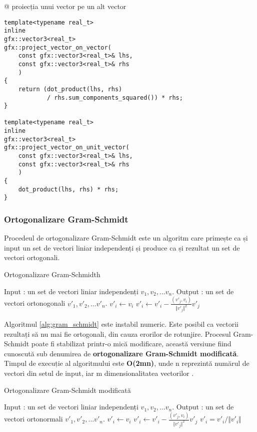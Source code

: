 \begin{easylist}[itemize]
@ proiecția unui vector pe un alt vector

\begin{lstlisting}
template<typename real_t>
inline
gfx::vector3<real_t>
gfx::project_vector_on_vector(
    const gfx::vector3<real_t>& lhs, 
    const gfx::vector3<real_t>& rhs
    )
{
    return (dot_product(lhs, rhs) 
            / rhs.sum_components_squared()) * rhs;
}

template<typename real_t>
inline
gfx::vector3<real_t>
gfx::project_vector_on_unit_vector(
    const gfx::vector3<real_t>& lhs, 
    const gfx::vector3<real_t>& rhs
    )
{
    dot_product(lhs, rhs) * rhs;
}
\end{lstlisting}

\end{easylist}

\subsubsection{Ortogonalizare Gram-Schmidt}
\label{ch1:sec_vectors:sub_gram_schmidt}
Procedeul de ortogonalizare Gram-Schmidt este un algoritm care primește ca și
input un set de vectori liniar independenți și produce ca și rezultat un set de
vectori ortogonali.

\begin{algorithm}
\caption{Ortogonalizare Gram-Schmidth}
\label{alg:gram_schmidt}
\begin{algorithmic}
\STATE Input : un set de vectori liniar independenți $v_1, v_2, \dots v_n$.
\STATE Output : un set de vectori ortonogonali $v'_1, v'_2, \dots v'_n$.
\STATE $v'_i \leftarrow v_i$
\STATE $v'_i \leftarrow v'_i - \frac{(v'_j, v_i)}{\Vert v'_j \Vert ^ 2}v'_j$
\ENDFOR 
\ENDFOR
\end{algorithmic}
\end{algorithm}
Algoritmul \ref{alg:gram_schmidt} este instabil numeric. Este posibil ca
vectorii rezultați să nu mai fie ortogonali, din cauza erorilor de rotunjire. 
Procesul Gram-Schmidt poate fi stabilizat printr-o mică modificare, această
versiune fiind cunoscută sub denumirea de \textbf{ortogonalizare Gram-Schmidt
modificată}. Timpul de execuție al algoritmului este \textbf{O(2mn)}, unde n
reprezintă numărul de vectori din setul de input, iar m dimensionalitatea vectorilor
\cite{GolubVanLoan96}.

\begin{algorithm}
\caption{Ortogonalizare Gram-Schmidt modificată}
\label{alg:modified_gram_schmidt}
\begin{algorithmic}
\STATE Input : un set de vectori liniar independenți $v_1, v_2, \dots v_n$.
\STATE Output : un set de vectori ortonormali $v'_1, v'_2, \dots v'_n$.
\STATE $v'_i \leftarrow v_i$
\STATE $v'_i \leftarrow v'_i - \frac{(v'_j, v_i)}{\Vert v'_j \Vert ^ 2}v'_j$
\ENDFOR 
\STATE $v'_i = v'_i / \Vert v'_i \Vert$ 
\ENDFOR
\end{algorithmic}
\end{algorithm}
